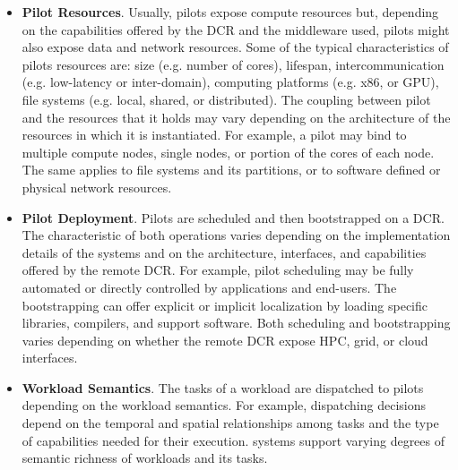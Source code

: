 \documentclass{sig-alternate}
\begin{document}
\begin{itemize}

\item \textbf{Pilot Resources}. Usually, pilots expose compute resources but,
  depending on the capabilities offered by the DCR and the middleware used,
  pilots might also expose data and network resources. Some of the typical
  characteristics of pilots resources are: size (e.g. number of cores),
  lifespan, intercommunication (e.g. low-latency or inter-domain), computing
  platforms (e.g. x86, or GPU), file systems (e.g. local, shared, or
  distributed). The coupling between pilot and the resources that it holds may
  vary depending on the architecture of the resources in which it is
  instantiated. For example, a pilot may bind to multiple compute nodes, single
  nodes, or portion of the cores of each node. The same applies to file systems
  and its partitions, or to software defined or physical network resources.


\item \textbf{Pilot Deployment}. Pilots are scheduled and then bootstrapped on
  a DCR. The characteristic of both operations varies depending on the
  implementation details of the \pilot systems and on the architecture,
  interfaces, and capabilities offered by the remote DCR. For example, pilot
  scheduling may be fully automated or directly controlled by applications and
  end-users. The bootstrapping can offer explicit or implicit localization by
  loading specific libraries, compilers, and support software. Both
  scheduling and bootstrapping varies depending on whether the remote DCR expose
  HPC, grid, or cloud interfaces.  

\item \textbf{Workload Semantics}. The tasks of a workload are dispatched to
  pilots depending on the workload semantics. For example, dispatching decisions
  depend on the temporal and spatial relationships among tasks and the type of
  capabilities needed for their execution. \pilot systems support varying
  degrees of semantic richness of workloads and its tasks.


\end{itemize}
\end{document}
